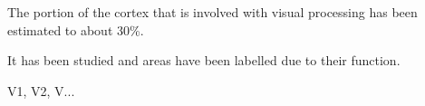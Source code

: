 The portion of the cortex that is involved with visual processing has been estimated to about 30\%.

It has been studied and areas have been labelled due to their function.

V1, V2, V...

